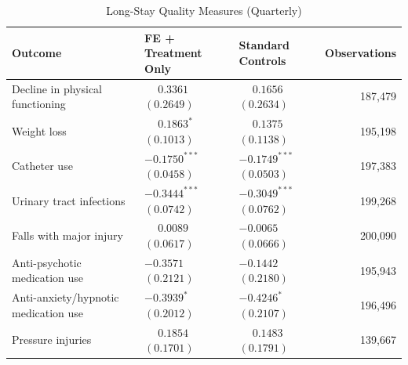 \documentclass[12pt]{article}
\begin{document}
\begin{table}[H]
\centering
\caption{Long-Stay Quality Measures (Quarterly)}
\label{tab:fe-only-long-stay-quality}
\small
\setlength{\tabcolsep}{6pt}
\begin{tabularx}{\textwidth}{@{} l Y Y r @{}}
\toprule
Outcome & FE + Treatment Only & Standard Controls & Observations \\
\midrule
Decline in physical functioning &  &  & 187,479 \\
Weight loss &  &  & 195,198 \\
Catheter use &  &  & 197,383 \\
Urinary tract infections &  &  & 199,268 \\
Falls with major injury &  &  & 200,090 \\
Anti-psychotic medication use &  &  & 195,943 \\
Anti-anxiety/hypnotic medication use &  &  & 196,496 \\
Pressure injuries &  &  & 139,667 \\
\bottomrule
\end{tabularx}
\end{table}
\end{document}
